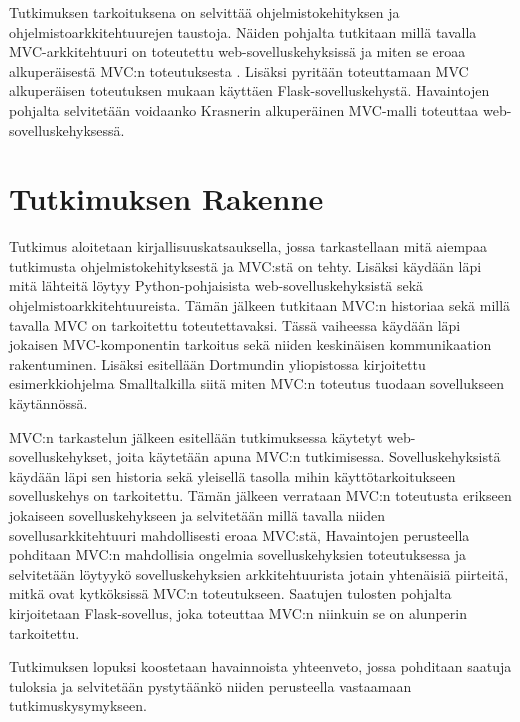 \documentclass[utf8]{gradu3}
\begin{document}
Tutkimuksen tarkoituksena on selvittää ohjelmistokehityksen ja ohjelmistoarkkitehtuurejen taustoja. Näiden pohjalta tutkitaan millä tavalla 
MVC-arkkitehtuuri on toteutettu web-sovelluskehyksissä ja miten se
eroaa alkuperäisestä MVC:n toteutuksesta \parencite{krasner}. Lisäksi pyritään toteuttamaan MVC alkuperäisen
toteutuksen mukaan käyttäen Flask-sovelluskehystä. Havaintojen pohjalta
selvitetään voidaanko Krasnerin alkuperäinen MVC-malli toteuttaa web-sovelluskehyksessä.

\chapter{Tutkimuksen Rakenne}
Tutkimus aloitetaan kirjallisuuskatsauksella, jossa tarkastellaan mitä aiempaa 
tutkimusta ohjelmistokehityksestä ja MVC:stä on tehty. Lisäksi käydään
läpi mitä lähteitä löytyy Python-pohjaisista web-sovelluskehyksistä sekä ohjelmistoarkkitehtuureista. Tämän jälkeen 
tutkitaan MVC:n historiaa sekä millä tavalla MVC on tarkoitettu toteutettavaksi.
Tässä vaiheessa käydään läpi jokaisen MVC-komponentin tarkoitus sekä niiden 
keskinäisen kommunikaation rakentuminen. Lisäksi esitellään
Dortmundin yliopistossa kirjoitettu esimerkkiohjelma Smalltalkilla siitä miten MVC:n 
toteutus tuodaan sovellukseen käytännössä.

MVC:n tarkastelun jälkeen esitellään tutkimuksessa käytetyt web-sovelluskehykset, 
joita käytetään apuna MVC:n tutkimisessa. Sovelluskehyksistä käydään läpi sen 
historia sekä yleisellä tasolla mihin käyttötarkoitukseen
sovelluskehys on tarkoitettu. Tämän jälkeen verrataan MVC:n toteutusta erikseen 
jokaiseen sovelluskehykseen ja selvitetään millä tavalla niiden sovellusarkkitehtuuri 
mahdollisesti eroaa MVC:stä,
Havaintojen perusteella pohditaan MVC:n mahdollisia ongelmia sovelluskehyksien toteutuksessa 
ja selvitetään löytyykö sovelluskehyksien arkkitehtuurista jotain yhtenäisiä piirteitä, mitkä ovat
kytköksissä MVC:n toteutukseen. Saatujen tulosten pohjalta  kirjoitetaan Flask-sovellus, joka toteuttaa MVC:n 
niinkuin se on alunperin tarkoitettu.

Tutkimuksen lopuksi koostetaan havainnoista yhteenveto, jossa pohditaan saatuja tuloksia ja selvitetään 
pystytäänkö niiden perusteella vastaamaan tutkimuskysymykseen.
\end{document}
